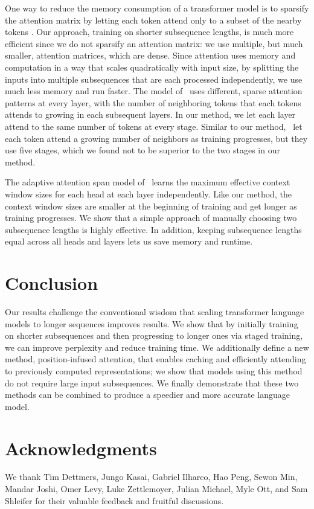 \documentclass[11pt,a4paper]{article}
\begin{document}
One way to reduce the memory consumption of a transformer model is to sparsify the attention matrix by letting each token attend only to a subset of the nearby tokens \cite{sparse-transformer, longformer}. Our approach, training on shorter subsequence lengths, is much more efficient since we do not sparsify an attention matrix: we use multiple, but much smaller, attention matrices, which are dense. Since attention uses memory and computation in a way that scales quadratically with input size, by splitting the inputs into multiple subsequences that are each processed independently, we use much less memory and run faster. 
The model of~\citet{longformer} uses different, sparse attention patterns at every layer, with the number of neighboring tokens that each tokens attends to growing in each subsequent layers. In our method, we let each layer attend to the same number of tokens at every stage. Similar to our method,~\citet{longformer} let each token attend a growing number of neighbors as training progresses, but they use five stages, which we found not to be superior to the two stages in our method. 

The adaptive attention span model of~\citet{sukhbaatar2019adaptive} learns the maximum effective context window sizes for each head at each layer independently. Like our method, the context window sizes are smaller at the beginning of training and get longer as training progresses. We show that a simple approach of manually choosing two subsequence lengths is highly effective. In addition, keeping subsequence lengths equal across all heads and layers lets us save memory and runtime. 
 \section{Conclusion}
Our results challenge the conventional wisdom that scaling transformer language models to longer sequences improves results.
We show that by initially training on shorter subsequences and then progressing to longer ones via staged training, we can improve perplexity and reduce training time. 
We additionally define a new method, position-infused attention, that enables caching and efficiently attending to previously computed representations; we show that models using this method do not require large input subsequences. 
We finally demonstrate that these two methods can be combined to produce a speedier and more accurate language model. 


\section*{Acknowledgments}
We thank Tim Dettmers, Jungo Kasai, Gabriel Ilharco, Hao Peng, Sewon Min,  Mandar Joshi, Omer Levy, Luke Zettlemoyer, Julian Michael, Myle Ott, and Sam Shleifer for their valuable feedback and fruitful discussions.  
\end{document}
